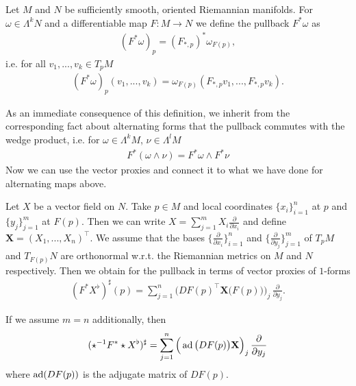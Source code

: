 \documentclass[../master_thesis.tex]{subfiles}
\begin{document}
\begin{definition}
    Let $M$ and $N$ be sufficiently smooth, oriented Riemannian manifolds.
    For $\omega \in \Lambda^k N$ and a differentiable map $F:M \rightarrow N$ 
    we define the pullback $F^*\omega$ as
    \begin{align*}
        (F^*\omega)_p = (F_{*,p})^* \omega_{F(p)},
    \end{align*}
    i.e. for all $v_1,...,v_k \in T_p M$
    \begin{align*}
        (F^*\omega)_p (v_1,...,v_k) = \omega_{F(p)}(F_{*,p} v_1, ..., F_{*,p} v_k).
    \end{align*}
\end{definition}
As an immediate consequence of this definition, we inherit from the corresponding fact about alternating forms
that 
the pullback commutes with the wedge product, i.e. for $\omega \in \Lambda^k M$, 
$\nu \in \Lambda^{l} M$
\begin{align*}
    F^*(\omega \wedge \nu ) = F^* \omega \wedge F^* \nu
\end{align*}
Now we can use the vector proxies and connect it to what we have done 
for alternating maps above. 
\begin{proposition}\label{prop:pullback_vector_fields}
    Let $X$ be a vector field on $N$. Take $p \in M$ and local coordinates
    $\{x_i\}_{i=1}^n$ at $p$ and $\{y_j\}_{j=1}^m$ at $F(p)$. 
    Then we can write $X = \sum_{j=1}^m X_i \frac{\partial}{\partial x_i}$
    and define $\mathbf{X} = (X_1,..., X_n)^\top$.
    We assume that the bases
    $\{ \frac{\partial}{\partial x_i} \}_{i=1}^n$ and 
    $\{ \frac{\partial}{\partial y_j} \}_{j=1}^m$ of $T_p M$ and $T_{F(p)} N$ 
    are orthonormal w.r.t. the Riemannian metrics
    on $M$ and $N$ respectively. 
    Then we obtain for the pullback in terms of
    vector proxies of $1$-forms
    \begin{align*}
        (F^* X^\flat)^\sharp(p)
        = \sum_{j=1}^n \Big(DF(p)^\top \mathbf{X}\big(F(p)\big)\Big)_j\, \frac{\partial}{\partial y_j}.
    \end{align*}

    If we assume $m=n$ additionally, then 
    \begin{align*}
        (\star^{-1} F^* \star X^\flat)^\sharp 
        = \sum_{j=1}^n \Big(\operatorname{ad}\big( DF(p) \big) \mathbf{X}\Big)_j\, \frac{\partial}{\partial y_j}
    \end{align*}
    where $\operatorname{ad}(DF(p))$ is the adjugate matrix of $DF(p)$.
\end{proposition}
\end{document}
